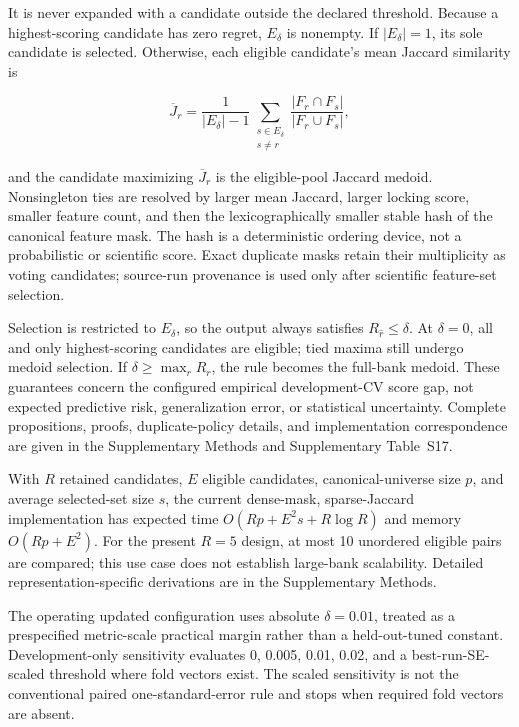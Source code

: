 It is never expanded with a candidate outside the declared threshold. Because a highest-scoring candidate has zero regret, \(E_\delta\) is nonempty. If \(|E_\delta|=1\), its sole candidate is selected. Otherwise, each eligible candidate's mean Jaccard similarity is

\begin{equation}
\overline J_r=\frac{1}{|E_\delta|-1}\sum_{\substack{s\in E_\delta\\s\ne r}}
\frac{|F_r\cap F_s|}{|F_r\cup F_s|},
\label{eq:eligible-medoid}
\end{equation}

and the candidate maximizing \(\overline J_r\) is the eligible-pool Jaccard medoid. Nonsingleton ties are resolved by larger mean Jaccard, larger locking score, smaller feature count, and then the lexicographically smaller stable hash of the canonical feature mask. The hash is a deterministic ordering device, not a probabilistic or scientific score. Exact duplicate masks retain their multiplicity as voting candidates; source-run provenance is used only after scientific feature-set selection.

Selection is restricted to \(E_\delta\), so the output always satisfies \(R_{\widehat r}\leq\delta\). At \(\delta=0\), all and only highest-scoring candidates are eligible; tied maxima still undergo medoid selection. If \(\delta\geq\max_rR_r\), the rule becomes the full-bank medoid. These guarantees concern the configured empirical development-CV score gap, not expected predictive risk, generalization error, or statistical uncertainty. Complete propositions, proofs, duplicate-policy details, and implementation correspondence are given in the Supplementary Methods and Supplementary Table~S17.

With \(R\) retained candidates, \(E\) eligible candidates, canonical-universe size \(p\), and average selected-set size \(s\), the current dense-mask, sparse-Jaccard implementation has expected time \(O(Rp+E^2s+R\log R)\) and memory \(O(Rp+E^2)\). For the present \(R=5\) design, at most 10 unordered eligible pairs are compared; this use case does not establish large-bank scalability. Detailed representation-specific derivations are in the Supplementary Methods.

The operating updated configuration uses absolute \(\delta=0.01\), treated as a prespecified metric-scale practical margin rather than a held-out-tuned constant. Development-only sensitivity evaluates 0, 0.005, 0.01, 0.02, and a best-run-SE-scaled threshold where fold vectors exist. The scaled sensitivity is not the conventional paired one-standard-error rule and stops when required fold vectors are absent.

